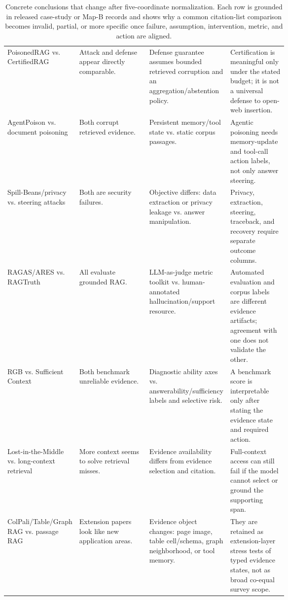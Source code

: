\documentclass[11pt]{article}
\begin{document}
\begin{table}[t]
\begin{tabularx}{\linewidth}{>{\raggedright\arraybackslash}p{0.17\linewidth}>{\raggedright\arraybackslash}p{0.25\linewidth}>{\raggedright\arraybackslash}p{0.24\linewidth}X}
PoisonedRAG \citep{poisonedRAG2024} vs. CertifiedRAG \citep{certifiedRAG2024} & Attack and defense appear directly comparable. & Defense guarantee assumes bounded retrieved corruption and an aggregation/abstention policy. & Certification is meaningful only under the stated budget; it is not a universal defense to open-web insertion. \\
AgentPoison \citep{rrag053} vs. document poisoning \citep{poisonedRAG2024} & Both corrupt retrieved evidence. & Persistent memory/tool state vs. static corpus passages. & Agentic poisoning needs memory-update and tool-call action labels, not only answer steering. \\
Spill-Beans/privacy \citep{venue200SpillBeans} vs. steering attacks \citep{poisonedRAG2024} & Both are security failures. & Objective differs: data extraction or privacy leakage vs. answer manipulation. & Privacy, extraction, steering, traceback, and recovery require separate outcome columns. \\
RAGAS/ARES \citep{ragas2024,ares2024} vs. RAGTruth \citep{ragTruth2024} & All evaluate grounded RAG. & LLM-as-judge metric toolkit vs. human-annotated hallucination/support resource. & Automated evaluation and corpus labels are different evidence artifacts; agreement with one does not validate the other. \\
RGB \citep{rgb2023} vs. Sufficient Context \citep{sufficientContext2024} & Both benchmark unreliable evidence. & Diagnostic ability axes vs. answerability/sufficiency labels and selective risk. & A benchmark score is interpretable only after stating the evidence state and required action. \\
Lost-in-the-Middle \citep{liu2024lostmiddle} vs. long-context retrieval & More context seems to solve retrieval misses. & Evidence availability differs from evidence selection and citation. & Full-context access can still fail if the model cannot select or ground the supporting span. \\
ColPali/Table/Graph RAG \citep{colpali2025,tableRAG2024,venueAcc004} vs. passage RAG & Extension papers look like new application areas. & Evidence object changes: page image, table cell/schema, graph neighborhood, or tool memory. & They are retained as extension-layer stress tests of typed evidence states, not as broad co-equal survey scope. \\
\bottomrule
\end{tabularx}
\caption{Concrete conclusions that change after five-coordinate normalization. Each row is grounded in released case-study or Map-B records and shows why a common citation-list comparison becomes invalid, partial, or more specific once failure, assumption, intervention, metric, and action are aligned.}
\label{tab:main-normalization-findings}
\end{table}
\end{document}

